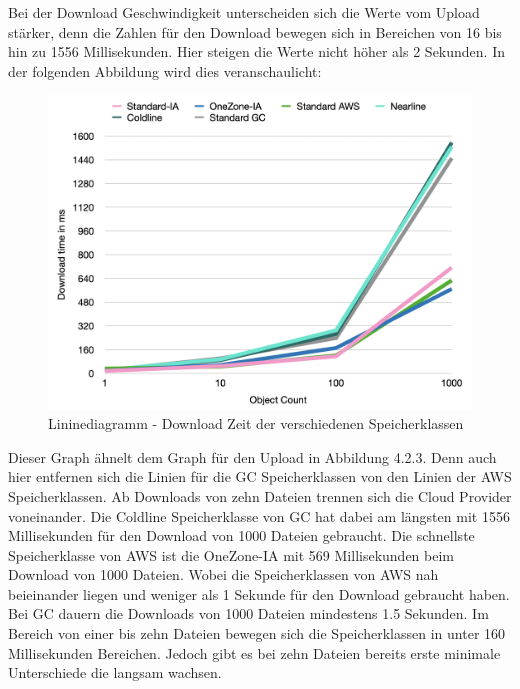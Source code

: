 \newpage

Bei der Download Geschwindigkeit unterscheiden sich die Werte vom Upload stärker, denn die Zahlen für den Download bewegen sich in Bereichen von 16 bis hin zu 1556 Millisekunden. Hier steigen die Werte nicht höher als 2 Sekunden. In der folgenden Abbildung wird dies veranschaulicht:

\begin{figure}[h]
	\centering
	\includegraphics[width=13cm,keepaspectratio]{Pictures/DownloadTime.png}
	\caption{Lininediagramm - Download Zeit der verschiedenen Speicherklassen}
\end{figure}

Dieser Graph ähnelt dem Graph für den Upload in Abbildung 4.2.3. Denn auch hier entfernen sich die Linien für die GC Speicherklassen von den Linien der AWS Speicherklassen. Ab Downloads von zehn Dateien trennen sich die Cloud Provider voneinander. Die Coldline Speicherklasse von GC hat dabei am längsten mit 1556 Millisekunden für den Download von 1000 Dateien gebraucht. Die schnellste Speicherklasse von AWS ist die OneZone-IA mit 569 Millisekunden beim Download von 1000 Dateien. Wobei die Speicherklassen von AWS nah beieinander liegen und weniger als 1 Sekunde für den Download gebraucht haben. Bei GC dauern die Downloads von 1000 Dateien mindestens 1.5 Sekunden. Im Bereich von einer bis zehn Dateien bewegen sich die Speicherklassen in unter 160 Millisekunden Bereichen. Jedoch gibt es bei zehn Dateien bereits erste minimale Unterschiede die langsam wachsen.\\
 